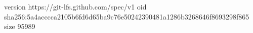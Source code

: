 version https://git-lfs.github.com/spec/v1
oid sha256:5a4acccca2105b6fd6d65ba9c76e50242390481a1286b3268646f8693298f865
size 95989

